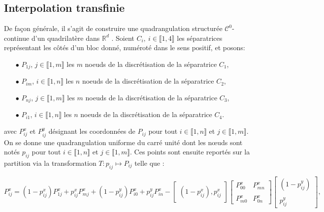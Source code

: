 \subsection{Interpolation transfinie}

De façon générale, il s'agit de construire une quadrangulation structurée $\mathcal{C}^0$-continue d'un quadrilatère dans $\mathbb{R}^d$ \cite{cook1974body}. Soient $C_i,~i\in\llbracket 1, 4\rrbracket$ les séparatrices représentant les côtés d'un bloc donné, numéroté dans le sens positif, et posons:
\begin{itemize}
 \item[$\bullet$] $P_{1j}$, $j\in\llbracket 1, m\rrbracket$ les $m$ noeuds de la discrétisation de la séparatrice $C_1$,\\
 \item[$\bullet$] $P_{im}$, $i\in\llbracket 1, n\rrbracket$ les $n$ noeuds de la discrétisation de la séparatrice $C_2$,\\
 \item[$\bullet$] $P_{nj}$, $j\in\llbracket 1, m\rrbracket$ les $m$ noeuds de la discrétisation de la séparatrice $C_3$,\\
 \item[$\bullet$] $P_{i1}$, $i\in\llbracket 1, n\rrbracket$ les $n$ noeuds de la discrétisation de la séparatrice $C_4$.\\
\end{itemize}

avec $P_{ij}^x$ et $P_{ij}^y$ désignant les coordonnées de $P_{ij}$ pour tout $i\in\llbracket 1, n\rrbracket$ et $j\in\llbracket 1, m\rrbracket$. On se donne une quadrangulation uniforme du carré unité dont les nœuds sont notés $p_{ij}$ pour tout $i\in\llbracket 1, n\rrbracket$ et $j\in\llbracket 1, m\rrbracket$. Ces points sont ensuite reportés sur la partition via la transformation $T:p_{ij}\mapsto P_{ij}$ telle que :

$$
P_{ij}^x=(1-p_{ij}^x)P_{1j}^x+p_{ij}^xP_{mj}^x+(1-p_{ij}^y)P_{i0}^x+p_{ij}^y P_{in}^x-
\begin{bmatrix}
(1-p_{ij}^x), p_{ij}^x
\end{bmatrix}
\begin{bmatrix}
P_{00}^x&P_{mn}^x\\\\
P_{m0}^x&P_{0n}^x
\end{bmatrix}
\begin{bmatrix}
(1-p_{ij}^y)\\\\
p_{ij}^y
\end{bmatrix},
$$

